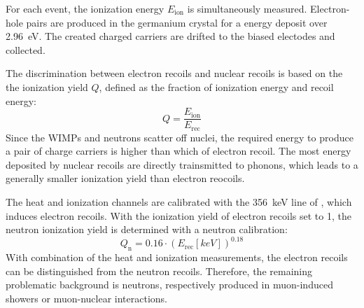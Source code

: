   For each event, the ionization energy $E_{\mathrm{ion}}$ is simultaneously measured. Electron-hole pairs are produced in the germanium crystal for a energy deposit over \SI{2.96}{eV}.%
  The created charged carriers are drifted to the biased electodes and collected.

  The discrimination between electron recoils and nuclear recoils is based on the the ionization yield $Q$, defined as the fraction of ionization energy and recoil energy:
  \begin{equation}
    Q=\frac{E_{\mathrm{ion}}}{E_{\mathrm{rec}}}
  \end{equation}
  Since the WIMPs and neutrons scatter off nuclei, the required energy to produce a pair of charge carriers is higher than which of electron recoil. The most energy deposited by nuclear recoils are directly trainsmitted to phonons, which leads to a generally smaller ionization yield than electron reocoils.

  The heat and ionization channels are calibrated with the \SI{356}{keV} line of , which induces electron recoils.%
  With the ionization yield of electron recoils set to 1, the neutron ionization yield is determined with a neutron calibration:%
  \begin{equation}
    Q_{\mathrm{n}}=0.16\cdot(E_{\mathrm{rec}}[\si{keV}])^{0.18}
  \end{equation}
  With combination of the heat and ionization measurements, the electron recoils can be distinguished from the neutron recoils. Therefore, the remaining problematic background is neutrons, respectively produced in muon-induced showers or muon-nuclear interactions.
